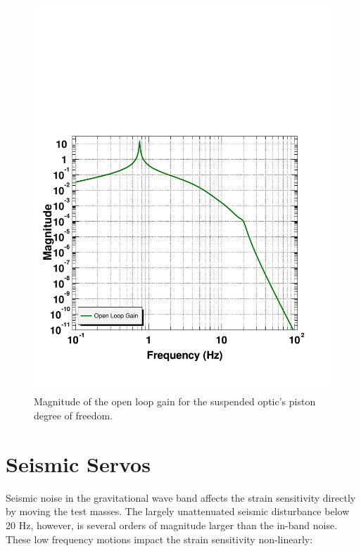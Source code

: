 \begin{figure}[!h]
\centerline{
\includegraphics[angle=0,width=6.5in]{Figures/Chap5/POSdamp.pdf}}
\caption[Pendulum Damping]{Magnitude of the open loop gain for the suspended
                           optic's piston degree of freedom.}
\label{fig:OSEMfilter}
\end{figure}




\section{Seismic Servos}
Seismic noise in the gravitational wave band affects the strain sensitivity directly by moving
the test masses. The largely unattenuated seismic disturbance below 20 Hz, 
however, is several orders of magnitude larger than the in-band noise. These 
low frequency motions impact the strain sensitivity non-linearly:

